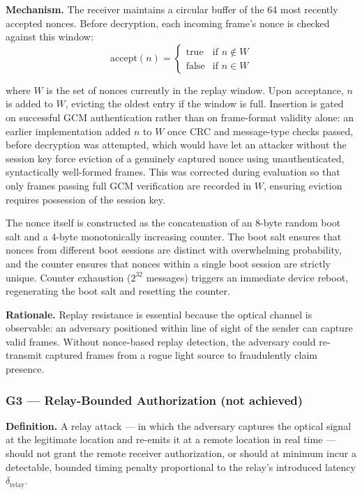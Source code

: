 \documentclass[conference]{IEEEtran}
\begin{document}
\textbf{Mechanism.} The receiver maintains a circular buffer of the 64 most recently accepted nonces. Before decryption, each incoming frame's nonce is checked against this window:
\begin{equation}
\text{accept}(n) = 
\begin{cases}
\text{true} & \text{if } n \notin W \\
\text{false} & \text{if } n \in W
\end{cases}
\label{eq:replay}
\end{equation}

\noindent where $W$ is the set of nonces currently in the replay window. Upon acceptance, $n$ is added to $W$, evicting the oldest entry if the window is full. Insertion is gated on successful GCM authentication rather than on frame-format validity alone: an earlier implementation added $n$ to $W$ once CRC and message-type checks passed, before decryption was attempted, which would have let an attacker without the session key force eviction of a genuinely captured nonce using unauthenticated, syntactically well-formed frames. This was corrected during evaluation so that only frames passing full GCM verification are recorded in $W$, ensuring eviction requires possession of the session key.

The nonce itself is constructed as the concatenation of an 8-byte random boot salt and a 4-byte monotonically increasing counter. The boot salt ensures that nonces from different boot sessions are distinct with overwhelming probability, and the counter ensures that nonces within a single boot session are strictly unique. Counter exhaustion ($2^{32}$ messages) triggers an immediate device reboot, regenerating the boot salt and resetting the counter.

\textbf{Rationale.} Replay resistance is essential because the optical channel is observable: an adversary positioned within line of sight of the sender can capture valid frames. Without nonce-based replay detection, the adversary could re-transmit captured frames from a rogue light source to fraudulently claim presence.

\subsubsection{G3 — Relay-Bounded Authorization (not achieved)}

\textbf{Definition.} A relay attack — in which the adversary captures the optical signal at the legitimate location and re-emits it at a remote location in real time — should not grant the remote receiver authorization, or should at minimum incur a detectable, bounded timing penalty proportional to the relay's introduced latency $\delta_{\text{relay}}$.
\end{document}
